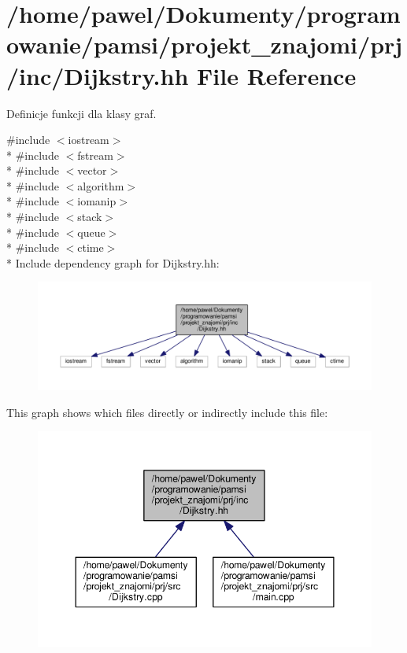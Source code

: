 \hypertarget{_dijkstry_8hh}{\section{/home/pawel/\-Dokumenty/programowanie/pamsi/projekt\-\_\-znajomi/prj/inc/\-Dijkstry.hh File Reference}
\label{_dijkstry_8hh}
}


Definicje funkcji dla klasy graf.  


{\ttfamily \#include $<$iostream$>$}\\*
{\ttfamily \#include $<$fstream$>$}\\*
{\ttfamily \#include $<$vector$>$}\\*
{\ttfamily \#include $<$algorithm$>$}\\*
{\ttfamily \#include $<$iomanip$>$}\\*
{\ttfamily \#include $<$stack$>$}\\*
{\ttfamily \#include $<$queue$>$}\\*
{\ttfamily \#include $<$ctime$>$}\\*
Include dependency graph for Dijkstry.\-hh\-:
\nopagebreak
\begin{figure}[H]
\begin{center}
\leavevmode
\includegraphics[width=350pt]{_dijkstry_8hh__incl}
\end{center}
\end{figure}
This graph shows which files directly or indirectly include this file\-:
\nopagebreak
\begin{figure}[H]
\begin{center}
\leavevmode
\includegraphics[width=347pt]{_dijkstry_8hh__dep__incl}
\end{center}
\end{figure}
